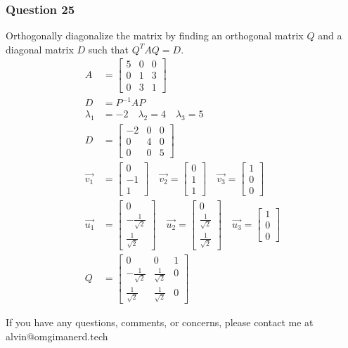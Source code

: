 \documentclass{math}
\begin{document}
\subsubsection*{Question 25}
Orthogonally diagonalize the matrix by finding an orthogonal matrix \( Q \) and
a diagonal matrix \( D \) such that \( Q^TAQ = D \).
\begin{align*}
  A &= \begin{bmatrix}
    5 & 0 & 0 \\
    0 & 1 & 3 \\
    0 & 3 & 1
  \end{bmatrix} \\
  D &= P^{-1}AP \\
  \lambda_1 &= -2 \quad \lambda_2 = 4 \quad \lambda_3 = 5 \\
  D &= \begin{bmatrix}
    -2 & 0 & 0 \\
    0 & 4 & 0 \\
    0 & 0 & 5
  \end{bmatrix} \\
  \vec{v_1} &= \begin{bmatrix}0 \\ -1 \\ 1\end{bmatrix} \quad
    \vec{v_2} = \begin{bmatrix}0 \\ 1 \\ 1\end{bmatrix} \quad
    \vec{v_3} = \begin{bmatrix}1 \\ 0 \\ 0\end{bmatrix} \\
  \vec{u_1} &= \begin{bmatrix}
    0 \\ -\frac{1}{\sqrt{2}} \\ \frac{1}{\sqrt{2}}
  \end{bmatrix} \quad \vec{u_2} = \begin{bmatrix}
    0 \\ \frac{1}{\sqrt{2}} \\ \frac{1}{\sqrt{2}}
  \end{bmatrix} \quad \vec{u_3} = \begin{bmatrix}
    1 \\ 0 \\ 0
  \end{bmatrix} \\
  Q &= \begin{bmatrix}
    0 & 0 & 1 \\
    -\frac{1}{\sqrt{2}} & \frac{1}{\sqrt{2}} & 0 \\
    \frac{1}{\sqrt{2}} & \frac{1}{\sqrt{2}} & 0
  \end{bmatrix}
\end{align*}

\begin{center}
  If you have any questions, comments, or concerns, please contact me at
  alvin@omgimanerd.tech
\end{center}
\end{document}
